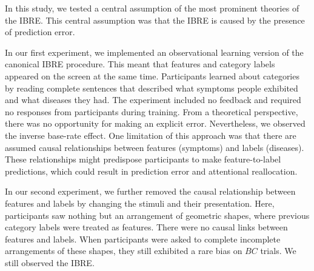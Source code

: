 \documentclass[10pt,letterpaper]{article}
\begin{document}
In this study, we tested a central assumption of the most prominent theories of the IBRE.
This central assumption was that the IBRE is caused by the presence of prediction error.

In our first experiment, we implemented an observational learning version of the canonical IBRE procedure.
This meant that features and category labels appeared on the screen at the same time.
Participants learned about categories by reading complete sentences that described what symptoms people exhibited and what diseases they had.
The experiment included no feedback and required no responses from participants during training.
From a theoretical perspective, there was no opportunity for making an explicit error.
Nevertheless, we observed the inverse base-rate effect.
One limitation of this approach was that there are assumed causal relationships between features (symptoms) and labels (diseases).
These relationships might predispose participants to make feature-to-label predictions, which could result in prediction error and attentional reallocation.

In our second experiment, we further removed the causal relationship between features and labels by changing the stimuli and their presentation.
Here, participants saw nothing but an arrangement of geometric shapes, where previous category labels were treated as features.
There were no causal links between features and labels.
When participants were asked to complete incomplete arrangements of these shapes, they still exhibited a rare bias on $BC$ trials.
We still observed the IBRE.

\end{document}
